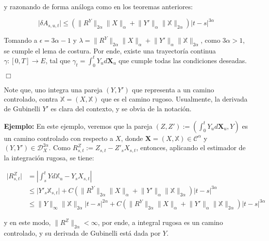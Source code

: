 y razonando de forma análoga como en los teoremas anteriores:

\[
	\lvert \delta A_{s,u,t} \rvert \leq \left(  \lVert R^Y \rVert_{2\alpha} \lVert X \rVert_{\alpha} + \lVert Y' \rVert_{\alpha}  \lVert \mathbb{X} \rVert_{2\alpha} \right) \lvert t - s \rvert^{3\alpha}
\]

Tomando a $\epsilon = 3\alpha - 1$ y $\lambda = \lVert R^Y \rVert_{2\alpha} \lVert X \rVert_{\alpha} + \lVert Y' \rVert_{\alpha}  \lVert \mathbb{X} \rVert_{2\alpha}$, como $3 \alpha > 1$, se cumple el lema de costura. Por ende, existe una trayectoría continua $\gamma: [0,T] \rightarrow E$, tal que $\gamma_t = \int_0^t Y_u d \mathbf{X}_u$ que cumple todas las condiciones deseadas.

\begin{flushright}
	$\Box$
\end{flushright}


Note que, uno integra una pareja $(Y, Y')$ que representa a un camino controlado, contra $\mathbb{X} = (X, \mathbb{X})$ que es el camino rugoso. Usualmente, la derivada de Gubinelli $Y'$ es clara del contexto, y se obvia de la notación.

\textbf{Ejemplo:} En este ejemplo, veremos que la pareja $(Z, Z') := \left( \int_0^t Y_u d \mathbf{X}_u, Y \right)$ es un camino controlado con respecto a $X$, donde $\mathbf{X} = (X, \mathbb{X}) \in \mathcal{C}^{\alpha}$ y $(Y, Y') \in \mathscr{D}^{2 \alpha}_X$. Como $R^Z_{s,t} := Z_{s,t} - Z'_s X_{s,t}$, entonces, aplicando el estimador de la integración rugosa, se tiene:

\begin{align*}
	\lvert R^Z_{s,t} \rvert &= \left\lvert \int_s^t Y d\mathbb{X}_u - Y_s X_{s,t} \right\rvert \\
	&\leq \lvert Y'_s \mathbb{X}_{s,t} \rvert + C \left( \lVert R^Y \rVert_{2 \alpha} \lVert X \rVert_{\alpha} + \lVert Y' \rVert_{\alpha} \lVert \mathbb{X} \rVert_{2 \alpha}  \right) \lvert t - s \rvert^{3 \alpha} \\
	&\leq \lVert Y \rVert_{\infty} \lVert \mathbb{X} \rVert_{2 \alpha} \lvert t - s  \rvert^{2 \alpha} + C \left( \lVert R^Y \rVert_{2 \alpha} \lVert X \rVert_{\alpha} + \lVert Y' \rVert_{\alpha} \lVert \mathbb{X} \rVert_{2 \alpha}  \right) \lvert t - s \rvert^{3 \alpha} 
\end{align*}

y en este modo, $\lVert R^Z \rVert_{2 \alpha} < \infty$, por ende, a integral rugosa es un camino controlado, y su derivada de Gubinelli está dada por $Y$.

